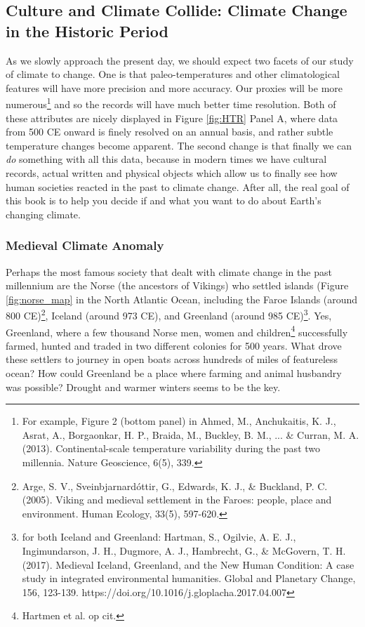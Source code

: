 \subsection{Culture and Climate Collide: Climate Change in the Historic Period}
As we slowly approach the present day, we should expect two facets of our study of climate to change. One is that paleo-temperatures and other climatological features will have more precision and more accuracy. Our proxies will be more numerous\footnote{For example, Figure 2 (bottom panel) in Ahmed, M., Anchukaitis, K. J., Asrat, A., Borgaonkar, H. P., Braida, M., Buckley, B. M., ... \& Curran, M. A. (2013). Continental-scale temperature variability during the past two millennia. Nature Geoscience, 6(5), 339.} and so the records will have much better time resolution. Both of these attributes are nicely displayed in Figure \ref{fig:HTR} Panel A, where data from 500 CE onward is finely resolved on an annual basis, and rather subtle temperature changes become apparent. The second change is that finally we can \emph{do} something with all this data, because in modern times we have cultural records, actual written and physical objects which allow us to finally see how human societies reacted in the past to climate change. After all, the real goal of this book is to help you decide if and what you want to do about Earth's changing climate.

\subsubsection{Medieval Climate Anomaly}
Perhaps the most famous society that dealt with climate change in the past millennium are the Norse (the ancestors of Vikings) who settled islands (Figure \ref{fig:norse_map} in the North Atlantic Ocean, including the Faroe Islands (around 800 CE)\footnote{Arge, S. V., Sveinbjarnard\'ottir, G., Edwards, K. J., \& Buckland, P. C. (2005). Viking and medieval settlement in the Faroes: people, place and environment. Human Ecology, 33(5), 597-620.}, Iceland (around 973 CE), and Greenland (around 985 CE)\footnote{for both Iceland and Greenland: Hartman, S., Ogilvie, A. E. J., Ingimundarson, J. H., Dugmore, A. J., Hambrecht, G., \& McGovern, T. H. (2017). Medieval Iceland, Greenland, and the New Human Condition: A case study in integrated environmental humanities. Global and Planetary Change, 156, 123-139. https://doi.org/10.1016/j.gloplacha.2017.04.007
}. Yes, Greenland, where a few thousand Norse men, women and children\footnote{Hartmen et al. op cit.} successfully farmed, hunted and traded in two different colonies for 500 years. What drove these settlers to journey in open boats across hundreds of miles of featureless ocean? How could Greenland be a place where farming and animal husbandry was possible? Drought and warmer winters seems to be the key.\\

